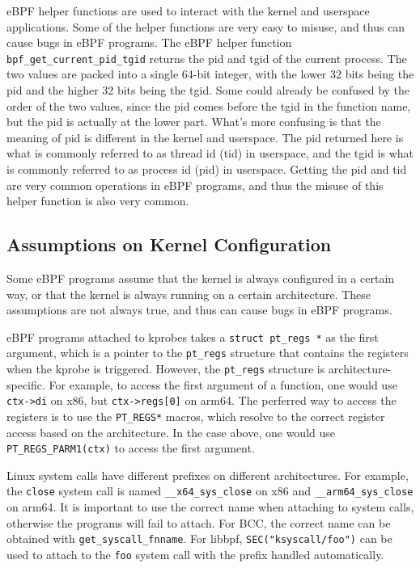 eBPF helper functions are used to interact with the kernel and userspace applications.
Some of the helper functions are very easy to misuse, and thus can cause bugs in eBPF programs.
The eBPF helper function \texttt{bpf\_get\_current\_pid\_tgid} returns the pid and tgid of the current process.
The two values are packed into a single 64-bit integer, with the lower 32 bits being the pid and the higher 32 bits being the tgid.
Some could already be confused by the order of the two values, since the pid comes before the tgid in the function name, but the pid is actually at the lower part. 
What's more confusing is that the meaning of pid is different in the kernel and userspace.
The pid returned here is what is commonly referred to as thread id (tid) in userspace, and the tgid is what is commonly referred to as process id (pid) in userspace.
Getting the pid and tid are very common operations in eBPF programs, and thus the misuse of this helper function is also very common. 



\subsection{Assumptions on Kernel Configuration}
Some eBPF programs assume that the kernel is always configured in a certain way, or that the kernel is always running on a certain architecture.
These assumptions are not always true, and thus can cause bugs in eBPF programs.

eBPF programs attached to kprobes takes a \texttt{struct pt\_regs *} as the first argument, which is a pointer to the \texttt{pt\_regs} structure that contains the registers when the kprobe is triggered.
However, the \texttt{pt\_regs} structure is architecture-specific. For example, to access the first argument of a function, one would use \texttt{ctx->di} on x86, but \texttt{ctx->regs[0]} on arm64.
The perferred way to access the registers is to use the \texttt{PT\_REGS*} macros, which resolve to the correct register access based on the architecture.
In the case above, one would use \texttt{PT\_REGS\_PARM1(ctx)} to access the first argument.

Linux system calls have different prefixes on different architectures. For example, the \texttt{close} system call is named \texttt{\_\_x64\_sys\_close} on x86 and \texttt{\_\_arm64\_sys\_close} on arm64.
It is important to use the correct name when attaching to system calls, otherwise the programs will fail to attach.
For BCC, the correct name can be obtained with \texttt{get\_syscall\_fnname}.
For libbpf, \texttt{SEC("ksyscall/foo")} can be used to attach to the \texttt{foo} system call with the prefix handled automatically.


